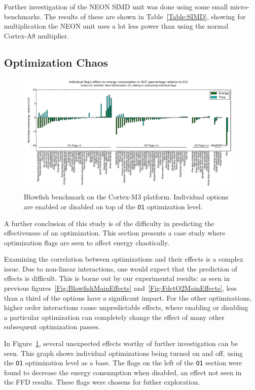 \documentclass[twocolumn]{article}
\let\oldcaption\caption
\renewcommand{\caption}[1]{\oldcaption{\textup{#1}}}
\begin{document}
Further investigation of the NEON SIMD unit was done using some small micro-benchmarks. The results of these are shown in Table~\ref{Table:SIMD}, showing for multiplication the NEON unit uses a lot less power than using the normal Cortex-A8 multiplier.

\subsection{Optimization Chaos}

\begin{figure}[bt]
	\includegraphics[width=\linewidth,clip,trim=0.5cm 0 0cm 1.8cm]{cortex-m3/O1_addsub_blowfish.pdf}
	\caption{Blowfish benchmark on the Cortex-M3 platform. Individual options are enabled or disabled on top of the \texttt{O1} optimization level.}
	\label{Fig:AddsubO1Blowfish}
\end{figure}

A further conclusion of this study is of the difficulty in predicting the effectiveness of an optimization. This section presents a case study where optimization flags are seen to affect energy chaotically.

Examining the correlation between optimizations and their effects is a complex issue. Due to non-linear interactions, one would expect that the prediction of effects is difficult. This is borne out by our experimental results: as seen in previous figures~\ref{Fig:BlowfishMainEffects} and~\ref{Fig:FdctO2MainEffects}, less than a third of the options have a significant impact. For the other optimizations, higher order interactions cause unpredictable effects, where enabling or disabling a particular optimization can completely change the effect of many other subsequent optimization passes.

In Figure~\ref{Fig:AddsubO1Blowfish}, several unexpected effects worthy of further investigation can be seen. This graph shows individual optimizations being turned on and off, using the \texttt{O1} optimization level as a base. The flags on the left of the \texttt{O1} section were found to decrease the energy consumption when disabled, an effect not seen in the FFD results. These flags were chosens for futher exploration.
\end{document}

